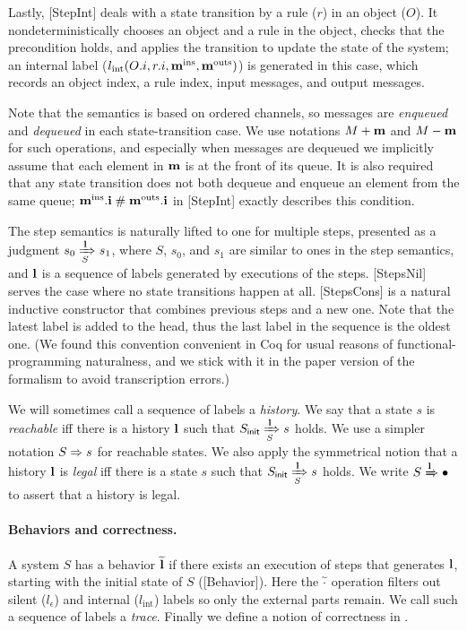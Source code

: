 Lastly, [StepInt] deals with a state transition by a rule ($r$) in an object ($O$).
It nondeterministically chooses an object and a rule in the object, checks that the precondition holds, and applies the transition to update the state of the system; an internal label ($\lblInt{\idxOf{O}}{\idxOf{r}}{\msgIns{m}}{\msgOuts{m}}$) is generated in this case, which records an object index, a rule index, input messages, and output messages.

Note that the semantics is based on ordered channels, so messages are \emph{enqueued} and \emph{dequeued} in each state-transition case.
We use notations $\enqMsgs{M}{\listof{m}}$ and $\deqMsgs{M}{\listof{m}}$ for such operations, and especially when messages are dequeued we implicitly assume that each element in $\listof{m}$ is at the front of its queue.
It is also required that any state transition does not both dequeue and enqueue an element from the same queue; $\disj{\midxIns{m}}{\midxOuts{m}}$ in [StepInt] exactly describes this condition.

The step semantics is naturally lifted to one for multiple steps, presented as a judgment $\semsteps{S}{s_0}{\listof{l}}{s_1}$, where $S$, $s_0$, and $s_1$ are similar to ones in the step semantics, and $\listof{l}$ is a sequence of labels generated by executions of the steps.
[StepsNil] serves the case where no state transitions happen at all.
[StepsCons] is a natural inductive constructor that combines previous steps and a new one.
Note that the latest label is added to the head, thus the last label in the sequence is the oldest one.
(We found this convention convenient in Coq for usual reasons of functional-programming naturalness, and we stick with it in the paper version of the formalism to avoid transcription errors.)

We will sometimes call a sequence of labels a \emph{history}.
We say that a state $s$ is \emph{reachable} iff there is a history $\listof{l}$ such that $\semsteps{S}{\sysInit{S}}{\listof{l}}{s}$ holds.
We use a simpler notation $\semrch{S}{s}$ for reachable states.
We also apply the symmetrical notion that a history $\listof{l}$ is \emph{legal} iff there is a state $s$ such that $\semsteps{S}{\sysInit{S}}{\listof{l}}{s}$ holds.
We write $\semleg{S}{\listof{l}}$ to assert that a history is legal.

\paragraph{Behaviors and correctness.}
A system $S$ has a behavior $\behOf{\listof{l}}$ if there exists an execution of steps that generates $\listof{l}$, starting with the initial state of $S$ ([Behavior]).
Here the $\behOf{\cdot}$ operation filters out silent ($l_\epsilon$) and internal ($l_{\textrm{int}}$) labels so only the external parts remain.
We call such a sequence of labels a \emph{trace}.
Finally we define a notion of correctness in \hemiola{}.

